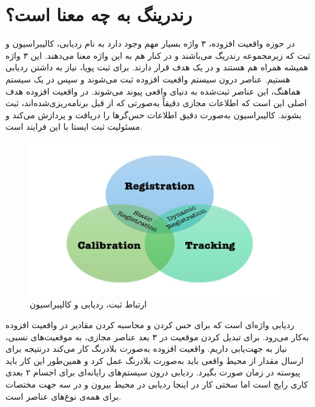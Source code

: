 \section{رندرینگ به چه معنا است؟}
در حوزه واقعیت افزوده، ۳ واژه بسیار مهم وجود دارد به نام ردیابی، کالیبراسیون و ثبت که زیرمجموعه رندریگ می‌باشند و در کنار هم به این واژه معنا می‌دهند. این ۳ واژه همیشه همراه هم هستند و در یک هدف قرار دارند. برای ثبت پویا، نیاز به داشتن ردیابی هستیم. عناصر درون سیستم واقعیت افزوده ثبت می‌شوند و سپس در یک سیستم هماهنگ، این عناصر ثبت‌شده به دنیای واقعی پیوند می‌شوند. در واقعیت افزوده هدف اصلی این است که اطلاعات مجازی دقیقاً به‌صورتی که از قبل برنامه‌ریزی‌شده‌اند، ثبت بشوند. کالیبراسیون به‌صورت دقیق اطلاعات حس‌گرها را دریافت و پردازش می‌کند و مسئولیت ثبت ایستا با این فرایند است\cite{siltanen2012theory}.

\begin{figure}
	\centering
	\includegraphics[width=1\linewidth]{image/rct}
	\caption {ارتباط ثبت، ردیابی و کالیبراسیون\cite{siltanen2012theory}}
	\label{fig:rct}
\end{figure}

ردیابی واژه‌ای است که برای حس کردن و محاسبه کردن مقادیر در واقعیت افزوده به‌کار می‌رود. برای تبدیل کردن موقعیت در ۳ بعد عناصر مجازی، به موقعیت‌های نسبی، نیاز به جهت‌یابی داریم. واقعیت افزوده به‌صورت بلادرنگ کار می‌کند درنتیجه برای ارسال مقدار از محیط واقعی باید به‌صورت بلادرنگ عمل کرد و همین‌طور این کار باید پیوسته در زمان صورت بگیرد. ردیابی درون سیستم‌های رایانه‌ای برای اجسام ۲ بعدی کاری رایج است اما سختی کار در اینجا ردیابی در محیط بیرون و در سه جهت مختصات برای همه‌ی نوع‌های عناصر است\cite{siltanen2012theory}.

